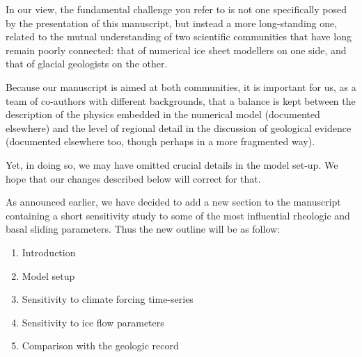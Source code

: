 \documentclass[10pt]{article}
\begin{document}
In our view, the fundamental challenge you refer to is not one specifically
posed by the presentation of this manuscript, but instead a more long-standing
one, related to the mutual understanding of two scientific communities that
have long remain poorly connected: that of numerical ice sheet modellers on one
side, and that of glacial geologists on the other.

Because our manuscript is aimed at both communities, it is important for us, as
a team of co-authors with different backgrounds, that a balance is kept between
the description of the physics embedded in the numerical model (documented
elsewhere) and the level of regional detail in the discussion of geological
evidence (documented elsewhere too, though perhaps in a more fragmented way).

Yet, in doing so, we may have omitted crucial details in the model set-up. We
hope that our changes described below will correct for that.


As announced earlier, we have decided to add a new section to the manuscript
containing a short sensitivity study to some of the most influential rheologic
and basal sliding parameters. Thus the new outline will be as follow:

\begin{enumerate}
    \item{Introduction}
    \item{Model setup}
    \item{Sensitivity to climate forcing time-series}
    \item{Sensitivity to ice flow parameters}
    \item{Comparison with the geologic record}
\end{enumerate}
\end{document}
